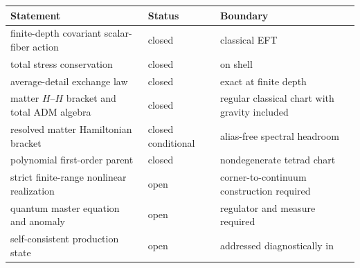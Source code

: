 \begin{longtable}{@{}P{0.45\textwidth}P{0.19\textwidth}P{0.26\textwidth}@{}}
\toprule
Statement & Status & Boundary\\
\midrule
finite-depth covariant scalar-fiber action & closed & classical EFT\\
total stress conservation & closed & on shell\\
average-detail exchange law & closed & exact at finite depth\\
matter $H$--$H$ bracket and total ADM algebra & closed & regular classical chart with gravity included\\
resolved matter Hamiltonian bracket & closed conditional & alias-free spectral headroom\\
polynomial first-order parent & closed & nondegenerate tetrad chart\\
strict finite-range nonlinear realization & open & corner-to-continuum construction required\\
quantum master equation and anomaly & open & regulator and measure required\\
self-consistent production state & open & addressed diagnostically in \\
\bottomrule
\end{longtable}
